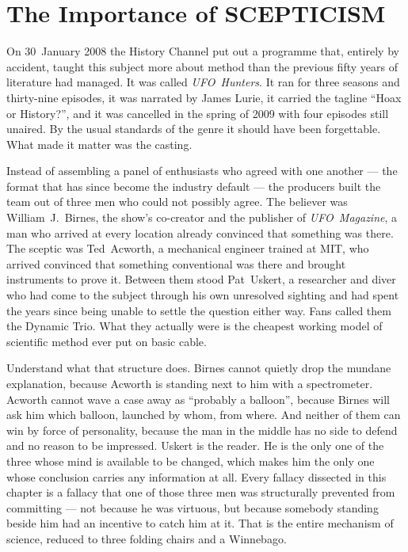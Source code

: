 \chapter{The Importance of SCEPTICISM}\label{ch:language}


On 30~January 2008 the History Channel put out a programme that, entirely by accident, taught this
subject more about method than the previous fifty years of literature had managed. It was
called \emph{UFO~Hunters}. It ran for three seasons and thirty-nine episodes, it was narrated by
James Lurie, it carried the tagline ``Hoax or History?'', and it was cancelled in the spring of
2009 with four episodes still unaired. By the usual
standards of the genre it should have been forgettable. What made it matter was the casting.

Instead of assembling a panel of enthusiasts who agreed with one another --- the format that has
since become the industry default --- the producers built the team out of three men who could not
possibly agree.  The believer was
William~J.\ Birnes, the show's co-creator and the publisher of \emph{UFO~Magazine}, a man who
arrived at every location already convinced that something was there. The sceptic was
Ted~Acworth, a mechanical engineer trained at MIT, who arrived convinced that something
conventional was there and brought instruments to prove it. Between them stood Pat~Uskert, a
researcher and diver who had come to the subject through his own unresolved sighting and had spent
the years since being unable to settle the question either way. Fans called them the Dynamic
Trio. What they actually were is the cheapest working model of scientific method ever put on
basic cable.

Understand what that structure does. Birnes cannot quietly drop the mundane explanation, because
Acworth is standing next to him with a spectrometer. Acworth cannot wave a case away as
``probably a balloon'', because Birnes will ask him which balloon, launched by whom, from where.
And neither of them can win by force of personality, because the man in the middle has no side to
defend and no reason to be impressed. Uskert is the reader. He is the only one of the three whose
mind is available to be changed, which makes him the only one whose conclusion carries any
information at all. Every fallacy dissected in this chapter is a fallacy that one of those three
men was structurally prevented from committing --- not because he was virtuous, but because
somebody standing beside him had an incentive to catch him at it. That is the entire mechanism of
science, reduced to three folding chairs and a Winnebago.

